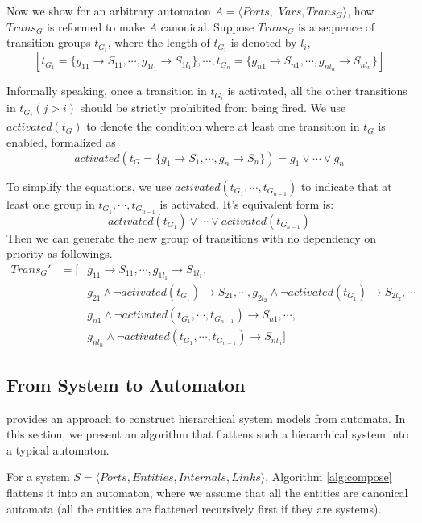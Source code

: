 Now we show for an arbitrary automaton $A=\langle Ports,$ $Vars,Trans_G\rangle$, how $Trans_G$ is reformed to make $A$ canonical.
Suppose $Trans_G$ is a sequence of transition groups $t_{G_i}$, where the length of $t_{G_i}$ is denoted by $l_i$,
\[
    [t_{G_1}=\{g_{11}\rightarrow S_{11},\cdots, g_{1l_1}\rightarrow S_{1l_1}\},\cdots,t_{G_n}=\{g_{n1}\rightarrow S_{n1},\cdots,g_{nl_n}\rightarrow S_{nl_n}\}]
\]

Informally speaking, once a transition in $t_{G_i}$ is activated, all the other transitions in $t_{G_j}(j>i)$ should be strictly prohibited from being fired. We use $activated(t_G)$ to denote the condition where at least one transition in $t_G$ is enabled, formalized as
\[
    activated(t_G=\{g_1\rightarrow S_1,\cdots, g_n\rightarrow S_n\}) = g_1\lor\cdots\lor g_n
\]

To simplify the equations, we use $activated(t_{G_1},\cdots,t_{G_{n-1}})$ to indicate that at least one group in $t_{G_1},\cdots,t_{G_{n-1}}$ is activated. It's equivalent form is:
\[
    activated(t_{G_1})\lor\cdots\lor activated(t_{G_{n-1}})
\]
Then we can generate the new group of transitions with no dependency on priority as followings.
\begin{eqnarray*}
    Trans_G' & = [ & g_{11}\rightarrow S_{11}, \cdots ,g_{1l_1}\rightarrow S_{1l_1}, \\
    & & g_{21}\land \lnot activated(t_{G_1})\rightarrow S_{21}, \cdots, g_{2l_2} \land \lnot activated(t_{G_1})\rightarrow S_{2l_2}, \cdots \\
    & & g_{n1}\land \lnot activated(t_{G_1},\cdots,t_{G_{n-1}})\rightarrow S_{n1}, \cdots, \\
    & & g_{nl_n} \land \lnot activated(t_{G_1},\cdots, t_{G_{n-1}})\rightarrow S_{nl_n}]
\end{eqnarray*}


\subsection{From System to Automaton}
\label{subsec:composition}

\lang{} provides an approach to construct hierarchical system models from automata. In this section, we present an algorithm that flattens such a hierarchical system into a typical automaton.

For a system $S=\langle Ports, Entities, Internals, Links\rangle$, Algorithm \ref{alg:compose} flattens it into an automaton, where we assume that all the entities are canonical automata (all the entities are flattened recursively first if they are systems).

